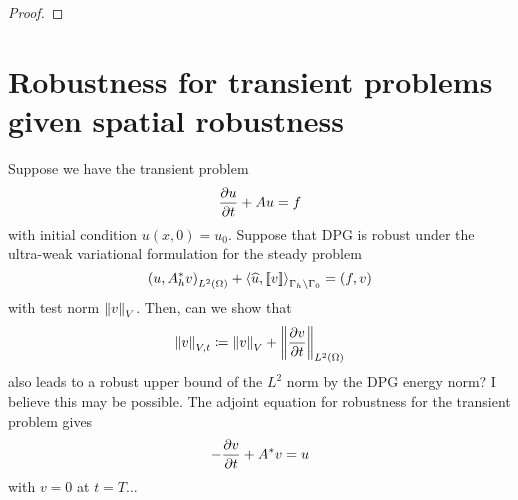 \documentclass{article}
\begin{document}
\begin{proof}
\end{proof}


\section{Robustness for transient problems given spatial robustness}

Suppose we have the transient problem
\[
\frac{\partial u}{\partial t} + Au = f
\]
with initial condition $u(x,0) = u_0$.  Suppose that DPG is robust under the ultra-weak variational formulation for the steady problem
\[
\left( u,A^*_h v \right)_{L^2\left( \Omega \right)} + \left\langle \widehat{u}, \left[ \![v]\! \right] \right\rangle_{\Gamma_h\setminus \Gamma_0} = \left( f,v \right)
\]
with test norm $\left\| v \right\|_{V}$.  Then, can we show that 
\[
\left\| v \right\|_{V,t} \coloneqq \left\| v \right\|_V + \left\| \frac{\partial v}{\partial t} \right\|_{L^2\left( \Omega \right)}
\]
also leads to a robust upper bound of the $L^2$ norm by the DPG energy norm?  I believe this may be possible.  The adjoint equation for robustness for the transient problem gives
\[
-\frac{\partial v}{\partial t} + A^*v = u
\]
with $v = 0$ at $t=T$...  
\end{document}
